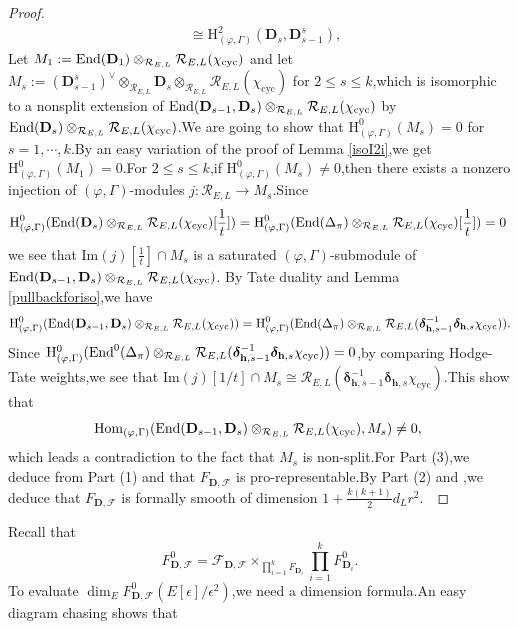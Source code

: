 \documentclass[SecEq,CM,GP]{degruyter-crelle} %
\theoremstyle{plain}
\newcommand{\ccyc}{{\chi_{\mathrm{cyc}}}}
\newcommand{\Dpik}{{\mathbf{D}}}
\newcommand{\EndO}{{\rm End}}
\newcommand{\homo}{{\rm Hom}}
\newcommand{\hH}{{\mathrm{H}}}
\newcommand{\bh}{{\mathbf{h}}}
\newcommand{\cR}{\mathcal R}
\newcommand{\cF}{\mathcal F}
\newcommand{\sF}{\mathscr F}
\begin{document}
\begin{proof}
\begin{equation*}
\begin{aligned}
		&\cong \hH^2_{(\varphi,\Gamma)}(\Dpik_{s},\Dpik^{s}_{s-1}),
	\end{aligned}
\end{equation*}
Let $M_1:=\EndO(\Dpik_1)\otimes_{\cR_{E,L}}\cR_{E,L}(\ccyc)$ and let $M_s:=(\Dpik^{s}_{s-1})^\vee\otimes_{\cR_{E,L}}\Dpik_{s}\otimes_{\cR_{E,L}}\cR_{E,L}(\ccyc)$ for $2\leq s\leq k$,\;which is isomorphic to a nonsplit extension of $\EndO(\Dpik_{s-1},\Dpik_{s})\otimes_{\cR_{E,L}}\cR_{E,L}( \ccyc)$ by $\EndO(\Dpik_{s})\otimes_{\cR_{E,L}}\cR_{E,L}(\ccyc)$.\;We are going to show that $\hH^0_{(\varphi,\Gamma)}(M_s)=0$ for $s=1,\cdots,k$.\;By an easy variation of the proof of Lemma \ref{isoI2i},\;we get $\hH^0_{(\varphi,\Gamma)}(M_1)=0$.\;For $2\leq s\leq k$,\;if $\hH^0_{(\varphi,\Gamma)}(M_s)\neq 0$,\;then there exists a nonzero injection of $(\varphi,\Gamma)$-modules $j:\cR_{E,L}\rightarrow M_s$.\;Since 
\[\hH^0_{(\varphi,\Gamma)}(\EndO(\Dpik_s)\otimes_{\cR_{E,L}}\cR_{E,L}(\ccyc)[\frac{1}{t}])=\hH^0_{(\varphi,\Gamma)}(\EndO({\Delta_\pi})\otimes_{\cR_{E,L}}\cR_{E,L}(\ccyc)[\frac{1}{t}])=0\;\]we see that $\mathrm{Im}(j)[\frac{1}{t}]\cap M_s$ is a saturated  $(\varphi,\Gamma)$-submodule of $\EndO(\Dpik_{s-1},\Dpik_{s})\otimes_{\cR_{E,L}}\cR_{E,L}(\ccyc)$. By Tate duality and Lemma \ref{pullbackforiso},\;we have
$$\hH^0_{(\varphi,\Gamma)}(\EndO(\Dpik_{s-1},\Dpik_{s})\otimes_{\cR_{E,L}}\cR_{E,L}( \ccyc))=\hH^0_{(\varphi,\Gamma)}(\EndO({\Delta_\pi})\otimes_{\cR_{E,L}}\cR_{E,L}( \bm{\delta}_{\bh,s-1}^{-1} \bm{\delta}_{\bh,s}\ccyc)).$$
Since 
$\hH^0_{(\varphi,\Gamma)}(\EndO^0({\Delta_\pi})\otimes_{\cR_{E,L}}\cR_{E,L}( \bm{\delta}_{\bh,s-1}^{-1}\bm{\delta}_{\bh,s}\ccyc))=0$,\;by comparing Hodge-Tate weights,\;we see that 
$\mathrm{Im}(j)[1/t]\cap M_s\cong \cR_{E,L}( \bm{\delta}_{\bh,s-1}^{-1} \bm{\delta}_{\bh,s}\ccyc)$.\;This show that
$$\homo_{(\varphi,\Gamma)}(\EndO(\Dpik_{s-1},\Dpik_{s})\otimes_{\cR_{E,L}}\cR_{E,L}( \ccyc),M_s)\neq 0,\;$$ which leads a contradiction to the fact that $M_s$ is non-split.\;For Part (3),\;we deduce from Part (1) and \cite[Proposition 3.4]{chenevier2011infinite} that $F_{\Dpik,\cF}$ is pro-representable.\;By Part (2) and \cite[Proposition 4.1.15 (2)]{Ding2021},\;we deduce that $F_{\Dpik,\cF}$ is formally smooth of dimension $1+\frac{k(k+1)}{2}d_Lr^2$.\
\end{proof}

Recall that
\[F_{\Dpik,\cF}^0=\sF_{\Dpik,\cF}\times_{\prod_{i=1}^k F_{\Dpik_i}}\prod_{i=1}^k F_{\Dpik_i}^0.\]
To evaluate $\dim_EF_{\Dpik,\cF}^0(E[\epsilon]/\epsilon^2)$,\;we  need a dimension formula.\;An easy diagram chasing shows that
\end{document}
